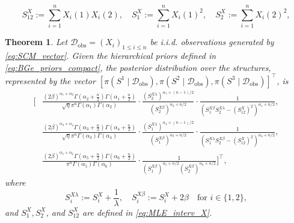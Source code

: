 \documentclass[10pt,a4paper]{amsart}
\newtheorem{theorem}{Theorem}
\newcommand{\obsdata}{\train_{\text{obs}}}
\newcommand{\train}{\mathcal{D}}
\def\transpose{\intercal}
\begin{document}
    \begin{equation}
        S^X_{12} := \sum_{i=1}^n X_i(1)X_i(2), \quad S^X_1:= \sum_{i=1}^n X_i(1)^2, \quad S^X_2:= \sum_{i=1}^n X_i(2)^2,
        \label{eq:MLE_interv_X}
    \end{equation}

\begin{theorem}
    \label{thm:BGe_nonindent}
    Let $\obsdata = (X_i)_{1\leq i\leq n}$ be i.i.d. observations generated by \eqref{eq:SCM_vector}. Given the hierarchical priors defined in \eqref{eq:BGe_priors_compact}, the posterior distribution over the structures, represented by the vector $[\pi(S^1 \mid \obsdata), \pi(S^2 \mid \obsdata), \pi(S^3 \mid \obsdata)]^\transpose$, is
    \begin{align*}
        \Bigg[ 
        & \frac{(2\beta)^{\alpha_1+\alpha_2} \Gamma(\alpha_2+\frac{n}{2})\Gamma(\alpha_1+\frac{n}{2})}{\sqrt{\eta} \pi^n \Gamma(\alpha_1)\Gamma(\alpha_2)} \cdot \frac{(S_2^{X\lambda})^{\alpha_1+(n-1)/2}}{(S_2^{X\beta})^{\alpha_2+n/2}} \cdot \frac{1}{(S_1^{X\beta} S_2^{X\lambda} - (S_{12}^X)^2)^{\alpha_1+n/2}}, \\
        & \frac{(2\beta)^{\alpha_3+\alpha_4} \Gamma(\alpha_3+\frac{n}{2})\Gamma(\alpha_4+\frac{n}{2})}{\sqrt{\eta} \pi^n \Gamma(\alpha_3)\Gamma(\alpha_4)} \cdot \frac{(S_1^{X\lambda})^{\alpha_4+(n-1)/2}}{(S_1^{X\beta})^{\alpha_3+n/2}} \cdot \frac{1}{(S_1^{X\lambda} S_2^{X\beta} - (S_{12}^X)^2)^{\alpha_4+n/2}}, \\
        & \frac{(2\beta)^{\alpha_5+\alpha_6} \Gamma(\alpha_5+\frac{n}{2})\Gamma(\alpha_6+\frac{n}{2})}{\pi^n \Gamma(\alpha_5)\Gamma(\alpha_6)} \cdot \frac{1}{(S_1^{X\beta})^{\alpha_5+n/2}(S_2^{X\beta})^{\alpha_6+n/2}} 
        \Bigg]^\transpose,
    \end{align*}
    where 
    \begin{equation}
        S_i^{X\lambda} := S_{i}^X + \frac{1}{\lambda}, \quad S_{i}^{X\beta} := S_{i}^X + 2\beta \quad \text{for } i \in \{1, 2\},
        \label{eq:def_S_beta_eta}
    \end{equation}
    and $S_1^X, S_2^X$, and $S_{12}^X$ are defined in \eqref{eq:MLE_interv_X}.
\end{theorem}
\end{document}
